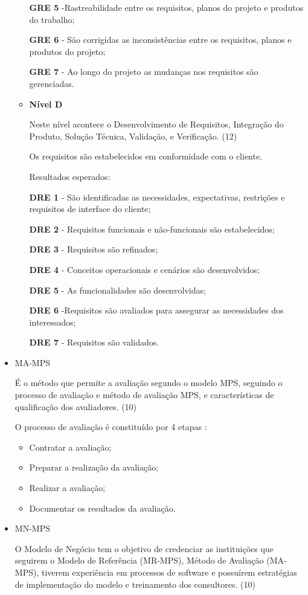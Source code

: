 \begin{itemize}
\begin{itemize}
\textbf{GRE 5} -Rastreabilidade entre os requisitos, planos do projeto e produtos do trabalho;

\textbf{GRE 6} - São corrigidas as inconsistências entre os requisitos, planos e produtos do projeto;

\textbf{GRE 7} - Ao longo do projeto as mudanças nos requisitos são gerenciadas.

\item\textbf{Nível D}

Neste nível acontece o Desenvolvimento de Requisitos, Integração do Produto, Solução Técnica, Validação, e Verificação. (12)

Os requisitos são estabelecidos em conformidade com o cliente.

Resultados esperados:

\textbf{DRE 1} - São identificadas as necessidades, expectativas, restrições e requisitos de interface do cliente;

\textbf{DRE 2} - Requisitos funcionais e não-funcionais são estabelecidos;

\textbf{DRE 3} - Requisitos são refinados;

\textbf{DRE 4} - Conceitos operacionais e cenários são desenvolvidos;

\textbf{DRE 5} - As funcionalidades são desenvolvidas;

\textbf{DRE 6} -Requisitos são avaliados para assegurar as necessidades dos interessados;

\textbf{DRE 7} - Requisitos são validados.

\end{itemize}

\item {MA-MPS}

É o método que permite a avaliação segundo o modelo MPS, seguindo o processo de avaliação e método de avaliação MPS, e características de qualificação dos avaliadores. (10)

O processo de avaliação é constituído por 4 etapas :

\begin{itemize}
\item Contratar a avaliação;
\item Preparar a realização da avaliação;
\item Realizar a avaliação;
\item Documentar os resultados da avaliação.
\end{itemize}

\item {MN-MPS}

O Modelo de Negócio tem o objetivo de credenciar as instituições que seguirem o Modelo de Referência (MR-MPS), Método de Avaliação (MA-MPS), tiverem experiência em processos de software e possuírem estratégias de implementação do modelo e treinamento dos consultores. (10)

\end{itemize}

